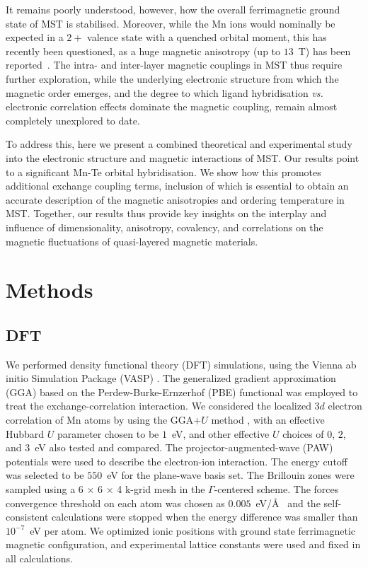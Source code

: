 \documentclass[preprint,amsmath,amssymb,aps,nofootinbib,superscriptaddress]{revtex4-2}
\begin{document}
It remains poorly understood, however, how the overall ferrimagnetic ground state of MST is stabilised. Moreover, while the Mn ions would nominally be expected in a ${2+}$ valence state with a quenched orbital moment, this has recently been questioned, as a huge magnetic anisotropy (up to $13$~T) has been reported~\cite{PRB2021Ni,Nature2021Seo,PRB2022Sala}. The intra- and inter-layer magnetic couplings in MST thus require further exploration, while the underlying electronic structure from which the magnetic order emerges, and the degree to which ligand hybridisation {\it vs.} electronic correlation effects dominate the magnetic coupling, remain almost completely unexplored to date. 

To address this, here we present a combined theoretical and experimental study into the electronic structure and magnetic interactions of MST. Our results point to a significant Mn-Te orbital hybridisation. We show how this promotes additional exchange coupling terms, inclusion of which is essential to obtain an accurate description of the magnetic anisotropies and ordering temperature in MST. Together, our results thus provide key insights on the interplay and influence of dimensionality, anisotropy, covalency, and correlations on the magnetic fluctuations of quasi-layered magnetic materials.

\section{Methods}

\subsection{DFT} 
We performed density functional theory (DFT) simulations, using the Vienna ab initio Simulation Package (VASP) \cite{PRB1996Kresse,CMS1996Kresse}. The generalized gradient approximation (GGA) based on the Perdew-Burke-Ernzerhof (PBE) functional \cite{PRL1996Perdew} was employed to treat the exchange-correlation interaction. We considered the localized 3$d$ electron correlation of Mn atoms by using the GGA+$U$ method \cite{PRB2006Wang,PRB1995Liechtenstein}, with an effective Hubbard $U$ parameter chosen to be $1$~eV, and other effective $U$ choices of $0$, $2$, and $3$~eV also tested and compared. The projector-augmented-wave (PAW) potentials \cite{PRB1994Bloch,PRB1999Kresse} were used to describe the electron-ion interaction. The energy cutoff was selected to be $550$~eV for the plane-wave basis set. The Brillouin zones were sampled using a 6 × 6 × 4 k-grid mesh in the $\Gamma$-centered scheme. The forces convergence threshold on each atom was chosen as $0.005$~eV/\AA~ and the self-consistent calculations were stopped when the energy difference was smaller than $10^{-7}$~eV per atom. We optimized ionic positions with ground state ferrimagnetic magnetic configuration, and experimental lattice constants were used and fixed in all calculations.
\end{document}
